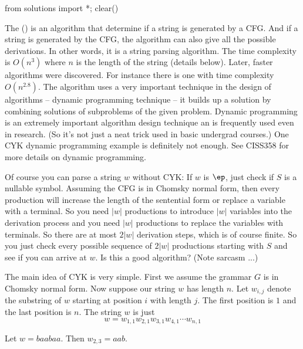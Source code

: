 \begin{python0}
from solutions import *; clear()
\end{python0}

The
 ()
is an algorithm that determine if a string is generated by a CFG.
And if a string is generated by the CFG,
the algorithm can also give all the possible derivations.
In other words, it is a string parsing algorithm.
The time complexity is $O(n^3)$ where $n$ is the length of the string
(details below).
Later, faster algorithms were discovered.
For instance there is one with time complexity $O(n^{2.8})$.
The algorithm uses a very important technique in the design of algorithms
-- dynamic programming technique -- it builds up a solution by combining
solutions of subproblems of the given problem. 
Dynamic programming is an extremely important algorithm design technique
an is frequently used even in research.
(So it's not just a neat trick used in basic undergrad courses.)
One CYK dynamic programming example is definitely not enough.
See CISS358 for more details on dynamic programming.

Of course you can parse a string $w$ without CYK:
If $w$ is $\ep$, just check if $S$ is a nullable symbol.
Assuming the CFG is in Chomsky normal form, then every
production will increase the length of the sentential form
or replace a variable with a terminal.
So you need $|w|$ productions to introduce $|w|$ variables into the
derivation process and you need $|w|$ productions to replace the variables
with terminals. So there are at most $2|w|$ derivation steps, which is
of course finite.
So you just check every possible sequence of $2|w|$ productions starting
with $S$ and see if you can arrive at $w$.
Is this a good algorithm?
(Note sarcasm ...)

The main idea of CYK is very simple.
First we assume the grammar $G$ is in Chomsky normal form.
Now suppose our string $w$ has length $n$.
Let $w_{i,j}$ denote the substring of $w$ starting at position $i$ with 
length $j$.
The first position is $1$ and the last position is $n$.
The string $w$ is just
\[
w = w_{1,1} w_{2,1} w_{3,1} w_{4,1} \cdots w_{n,1}
\]

\begin{eg} 
Let $w = baabaa$. Then $w_{2,3} = aab$.
\end{eg}


